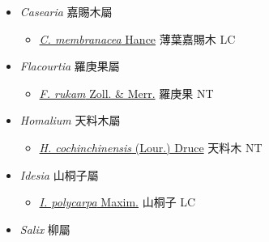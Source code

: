 
  \begin{itemize}
 \item[] \textit{Casearia} 嘉賜木屬
                    
  \begin{itemize}
        \item[] \href{http://www.theplantlist.org/tpl1.1/search?q=Casearia+membranacea}{\textit{C. membranacea} Hance}   薄葉嘉賜木 LC
  \end{itemize}
 \item[] \textit{Flacourtia} 羅庚果屬
                    
  \begin{itemize}
        \item[] \href{http://www.theplantlist.org/tpl1.1/search?q=Flacourtia+rukam}{\textit{F. rukam} Zoll. \& Merr.}   羅庚果 NT
  \end{itemize}
 \item[] \textit{Homalium} 天料木屬
                    
  \begin{itemize}
        \item[] \href{http://www.theplantlist.org/tpl1.1/search?q=Homalium+cochinchinensis}{\textit{H. cochinchinensis} (Lour.) Druce}   天料木 NT
  \end{itemize}
 \item[] \textit{Idesia} 山桐子屬
                    
  \begin{itemize}
        \item[] \href{http://www.theplantlist.org/tpl1.1/search?q=Idesia+polycarpa}{\textit{I. polycarpa} Maxim.}   山桐子 LC
  \end{itemize}
 \item[] \textit{Salix} 柳屬
                    

\end{itemize}

